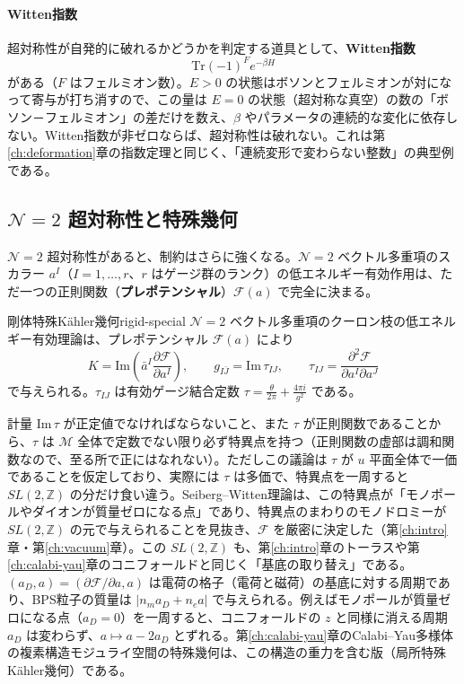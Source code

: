 \documentclass[uplatex, dvipdfmx, book]{jsbook}
\let\origsubsection\subsection
\let\origsubsubsection\subsubsection
\renewcommand{\section}{\origsubsection}
\renewcommand{\subsection}{\origsubsubsection}
\renewcommand{\subsubsection}{\paragraph}
\begin{document}
\paragraph{Witten指数}
超対称性が自発的に破れるかどうかを判定する道具として、\textbf{Witten指数}
\begin{equation}
    \mathrm{Tr}(-1)^F e^{-\beta H}
\end{equation}
がある（$F$ はフェルミオン数）。$E > 0$ の状態はボソンとフェルミオンが対になって寄与が打ち消すので、この量は $E = 0$ の状態（超対称な真空）の数の「ボソン－フェルミオン」の差だけを数え、$\beta$ やパラメータの連続的な変化に依存しない。Witten指数が非ゼロならば、超対称性は破れない。これは第\ref{ch:deformation}章の指数定理と同じく、「連続変形で変わらない整数」の典型例である。

\section{$\mathcal{N} = 2$ 超対称性と特殊幾何}

$\mathcal{N} = 2$ 超対称性があると、制約はさらに強くなる。$\mathcal{N} = 2$ ベクトル多重項のスカラー $a^I$（$I = 1, \dots, r$、$r$ はゲージ群のランク）の低エネルギー有効作用は、ただ一つの正則関数（\textbf{プレポテンシャル}）$\mathcal{F}(a)$ で完全に決まる。

\begin{myprop}{剛体特殊K\"ahler幾何}{rigid-special}
$\mathcal{N} = 2$ ベクトル多重項のクーロン枝の低エネルギー有効理論は、プレポテンシャル $\mathcal{F}(a)$ により
\begin{equation*}
    K = \mathrm{Im}\left( \bar{a}^I \frac{\partial\mathcal{F}}{\partial a^I} \right), \qquad
    g_{I\bar J} = \mathrm{Im}\,\tau_{IJ}, \qquad
    \tau_{IJ} = \frac{\partial^2\mathcal{F}}{\partial a^I \partial a^J}
\end{equation*}
で与えられる。$\tau_{IJ}$ は有効ゲージ結合定数 $\tau = \frac{\theta}{2\pi} + \frac{4\pi i}{g^2}$ である。
\end{myprop}

計量 $\mathrm{Im}\,\tau$ が正定値でなければならないこと、また $\tau$ が正則関数であることから、$\tau$ は $\mathcal{M}$ 全体で定数でない限り必ず特異点を持つ（正則関数の虚部は調和関数なので、至る所で正にはなれない）。ただしこの議論は $\tau$ が $u$ 平面全体で一価であることを仮定しており、実際には $\tau$ は多価で、特異点を一周すると $SL(2, \mathbb{Z})$ の分だけ食い違う。Seiberg--Witten理論\cite{seibergwitten1994}は、この特異点が「モノポールやダイオンが質量ゼロになる点」であり、特異点のまわりのモノドロミーが $SL(2, \mathbb{Z})$ の元で与えられることを見抜き、$\mathcal{F}$ を厳密に決定した（第\ref{ch:intro}章・第\ref{ch:vacuum}章）。この $SL(2, \mathbb{Z})$ も、第\ref{ch:intro}章のトーラスや第\ref{ch:calabi-yau}章のコニフォールドと同じく「基底の取り替え」である。$(a_D, a) = (\partial\mathcal{F}/\partial a, a)$ は電荷の格子（電荷と磁荷）の基底に対する周期であり、BPS粒子の質量は $|n_m a_D + n_e a|$ で与えられる。例えばモノポールが質量ゼロになる点（$a_D = 0$）を一周すると、コニフォールドの $z$ と同様に消える周期 $a_D$ は変わらず、$a \mapsto a - 2a_D$ とずれる。第\ref{ch:calabi-yau}章のCalabi--Yau多様体の複素構造モジュライ空間の特殊幾何は、この構造の重力を含む版（局所特殊K\"ahler幾何）である。
\end{document}
